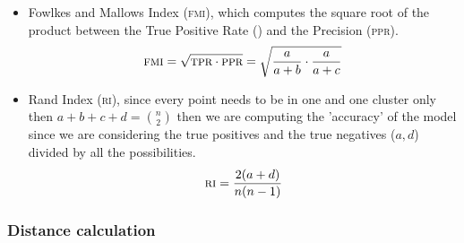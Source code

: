 \begin{itemize}
	\item Fowlkes and Mallows Index (\textsc{fmi})\cite{Fowlkes1983}, which computes the square root of the
		product between the True Positive Rate (\tpr) and the Precision (\textsc{ppr}).
		\begin{equation*}
			\textsc{fmi} = \sqrt{\textsc{tpr} \cdot \textsc{ppr}} = \sqrt{\frac{a}{a + b} \cdot \frac{a}{a + c}}
		\end{equation*}
	\item Rand Index (\textsc{ri})\cite{Rand1971}, since every point needs to be in one and one cluster only
		then $a + b + c + d = \binom{n}{2}$ then we are computing the 'accuracy' of the model
		since we are considering the true positives and the true negatives ($a, d$) divided
		by all the possibilities.
		\begin{equation*}
			\textsc{ri} = \frac{2(a + d)}{n(n - 1)}
		\end{equation*}
\end{itemize}

\subsubsection{Distance calculation}
\label{ssec:distance-calculation}














